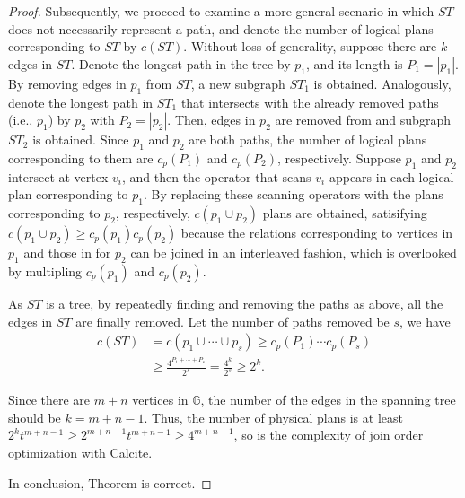 \begin{proof}
    Subsequently, we proceed to examine a more general scenario in which $ST$ does not necessarily represent a path, and denote the number of logical plans corresponding to $ST$ by $c(ST)$.
    Without loss of generality, suppose there are $k$ edges in $ST$.
    Denote the longest path in the tree by $p_1$, and its length is $P_1 = |p_1|$.
    By removing edges in $p_1$ from $ST$, a new subgraph $ST_1$ is obtained.
    Analogously, denote the longest path in $ST_1$ that intersects with the already removed paths (i.e., $p_1$) by $p_2$ with $P_2 = |p_2|$.
    Then, edges in $p_2$ are removed from and subgraph $ST_2$ is obtained.
    Since $p_1$ and $p_2$ are both paths, the number of logical plans corresponding to them are $c_p(P_1)$ and $c_p(P_2)$, respectively.
    Suppose $p_1$ and $p_2$ intersect at vertex $v_i$, and then the operator that scans $v_i$ appears in each logical plan corresponding to $p_1$.
    By replacing these scanning operators with the plans corresponding to $p_2$, respectively, $c(p_1 \cup p_2)$ plans are obtained, satisifying $c(p_1 \cup p_2) \geq c_p(p_1)c_p(p_2)$ because the relations corresponding to vertices in $p_1$ and those in for $p_2$ can be joined in an interleaved fashion, which is overlooked by multipling $c_p(p_1)$ and $c_p(p_2)$.

    As $ST$ is a tree, by repeatedly finding and removing the paths as above, all the edges in $ST$ are finally removed.
    Let the number of paths removed be $s$, we have
    \begin{equation*}
        \begin{split}
            c(ST) & = c(p_1 \cup \cdots \cup p_s) \geq c_p(P_1) \cdots c_p(P_s) \\
            & \geq \frac{4^{P_1 + \cdots + P_s}}{2^s} = \frac{4^{k}}{2^s} \geq 2^{k}.
        \end{split}
    \end{equation*}


    Since there are $m + n$ vertices in $\mathbb{G}$, the number of the edges in the spanning tree should be $k = m + n - 1$.
    Thus, the number of physical plans is at least $2^{k}t^{m+n-1} \geq 2^{m+n-1}t^{m+n-1} \geq 4^{m+n-1}$, so is the complexity of join order optimization with Calcite.

    In conclusion, Theorem  is correct.
\end{proof}



